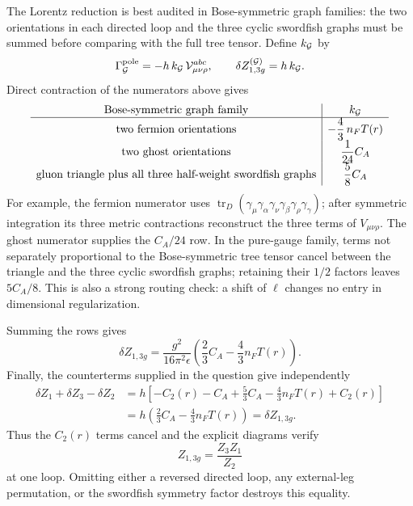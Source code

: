 \begin{enumerate}
  The Lorentz reduction is best audited in Bose-symmetric graph families:
  the two orientations in each directed loop and the three cyclic
  swordfish graphs must be summed before comparing with the full tree
  tensor.  Define \(k_{\cal G}\) by
  \[
    \Gamma_{\cal G}^{\rm pole}
      =-h\,k_{\cal G}\,{\cal V}_{\mu\nu\rho}^{abc},
    \qquad
    \delta Z_{1,3g}^{({\cal G})}=h\,k_{\cal G}.
  \]
  Direct contraction of the numerators above gives
  \[
  \begin{array}{c|c}
    \text{Bose-symmetric graph family}&k_{\cal G}\\ \hline
    \text{two fermion orientations}
      &-\dfrac43\,n_FT(r)\\[3pt]
    \text{two ghost orientations}
      &\dfrac1{24}C_A\\[3pt]
    \text{gluon triangle plus all three half-weight swordfish graphs}
      &\dfrac58C_A
  \end{array}
  \]
  For example, the fermion numerator uses
  \(\operatorname{tr}_{D}(\gamma_\mu\gamma_\alpha
  \gamma_\nu\gamma_\beta\gamma_\rho\gamma_\gamma)\);
  after symmetric integration its three metric contractions reconstruct
  the three terms of \(V_{\mu\nu\rho}\).  The ghost numerator supplies the
  \(C_A/24\) row.  In the pure-gauge family, terms not separately
  proportional to the Bose-symmetric tree tensor cancel between the
  triangle and the three cyclic swordfish graphs; retaining their
  \(1/2\) factors leaves \(5C_A/8\).  This is also a strong routing check:
  a shift of \(\ell\) changes no entry in dimensional regularization.

  Summing the rows gives
  \[
    \boxed{\delta Z_{1,3g}
      =\frac{g^2}{16\pi^2\epsilon}
       \left(\frac23C_A-\frac43n_FT(r)\right).}
  \]
  Finally, the counterterms supplied in the question give independently
  \[
  \begin{split}
    \delta Z_1+\delta Z_3-\delta Z_2
      &=
      h\left[-C_2(r)-C_A+\frac53C_A
        -\frac43n_FT(r)+C_2(r)\right]\\
      &=h\left(\frac23C_A-\frac43n_FT(r)\right)
       =\delta Z_{1,3g}.
  \end{split}
  \]
  Thus the \(C_2(r)\) terms cancel and the explicit diagrams verify
  \[
    \boxed{Z_{1,3g}=\frac{Z_3Z_1}{Z_2}}
  \]
  at one loop.  Omitting either a reversed directed loop, any external-leg
  permutation, or the swordfish symmetry factor destroys this equality.


\end{enumerate}
